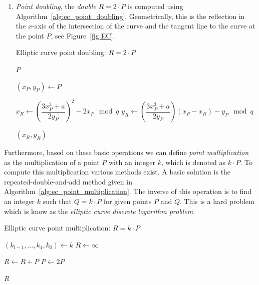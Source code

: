 \begin{enumerate}
  \item \emph{Point doubling}, the \emph{double} $R = 2 \cdot P$ is computed
    using Algorithm~\ref{alg:ec_point_doubling}. Geometrically, this is the
    reflection in the $x$-axis of the intersection of the curve and the tangent
    line to the curve at the point $P$, see Figure~\ref{fig:EC}.
    \begin{algorithm}
      \caption{Elliptic curve point doubling: $R = 2 \cdot P$}
      \label{alg:ec_point_doubling}

      \begin{algorithmic}[1]
            \Return $P$
          \EndIf

          \State $(x_P, y_P) \gets P$

          \State $x_R \gets \left(\dfrac{3 x_P^3 + a}{2 y_P}\right)^2 - 2 x_P \mod q$
          \State $y_R \gets \left(\dfrac{3 x_P^3 + a}{2 y_P}\right) (x_P - x_R) - y_P \mod q$

          \Return $(x_R, y_R)$
        \EndFunction
      \end{algorithmic}
    \end{algorithm}
\end{enumerate}

Furthermore, based on these basic operations we can define \emph{point
multiplication} as the multiplication of a point $P$ with an integer $k$, which
is denoted as $k \cdot P$. To compute this multiplication various methods exist.
A basic solution is the repeated-double-and-add method given in
Algorithm~\ref{alg:ec_point_multiplication}. The inverse of this operation is to
find an integer $k$ such that $Q = k \cdot P$ for given points $P$ and $Q$. This
is a hard problem which is know as the \emph{elliptic curve discrete logarithm
problem}.

\begin{algorithm}
  \caption{Elliptic curve point multiplication: $R = k \cdot P$}%
  \label{alg:ec_point_multiplication}

  \begin{algorithmic}[1]
      \State $(k_{l-1}, \dots, k_1, k_0) \gets k$ 
      \State $R \gets \infty$

          \State $R \gets R + P$
        \EndIf
        \State $P \gets 2P$
      \EndFor

      \Return $R$
    \EndFunction
  \end{algorithmic}
\end{algorithm}

